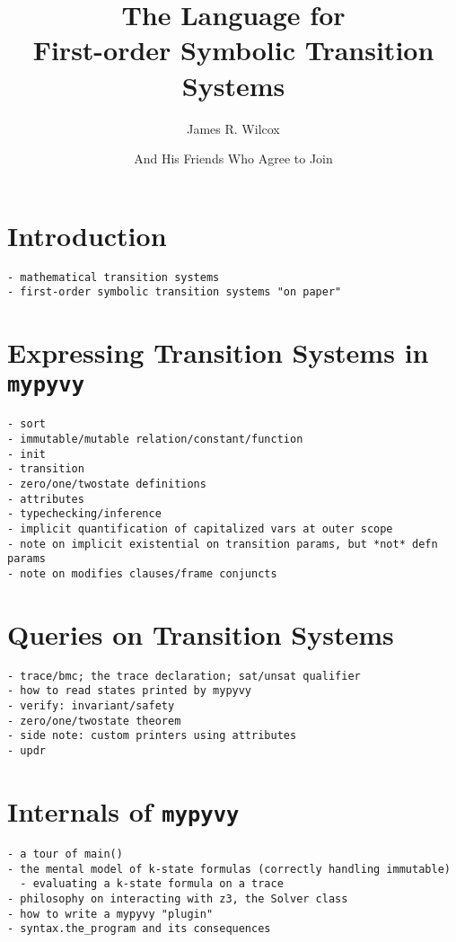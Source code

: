 \documentclass[10pt]{article}
\title{The \mypyvy{} Language for\\First-order Symbolic Transition Systems}
\author{James R. Wilcox \and And His Friends Who Agree to Join}
\date{}
\newcommand{\mypyvy}{\texttt{mypyvy}}
\begin{document}
\maketitle

\section*{Introduction}

\begin{verbatim}
- mathematical transition systems
- first-order symbolic transition systems "on paper"
\end{verbatim}

\section*{Expressing Transition Systems in \mypyvy}

\begin{verbatim}
- sort
- immutable/mutable relation/constant/function
- init
- transition
- zero/one/twostate definitions
- attributes
- typechecking/inference
- implicit quantification of capitalized vars at outer scope
- note on implicit existential on transition params, but *not* defn params
- note on modifies clauses/frame conjuncts
\end{verbatim}

\section*{Queries on Transition Systems}

\begin{verbatim}
- trace/bmc; the trace declaration; sat/unsat qualifier
- how to read states printed by mypyvy
- verify: invariant/safety
- zero/one/twostate theorem
- side note: custom printers using attributes
- updr
\end{verbatim}

\section*{Internals of \mypyvy}

\begin{verbatim}
- a tour of main()
- the mental model of k-state formulas (correctly handling immutable)
  - evaluating a k-state formula on a trace
- philosophy on interacting with z3, the Solver class
- how to write a mypyvy "plugin"
- syntax.the_program and its consequences
\end{verbatim}
\end{document}
